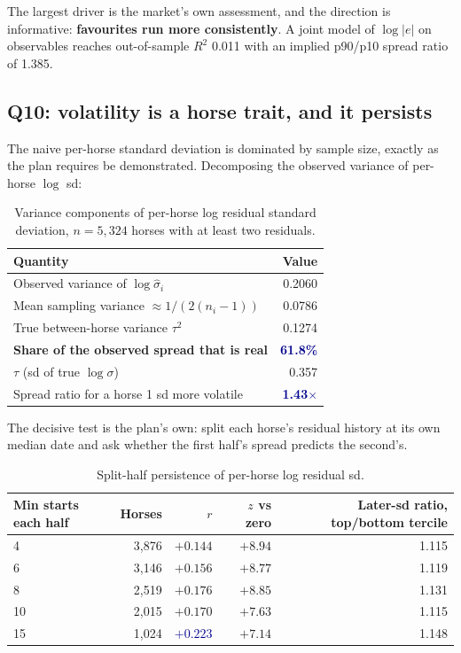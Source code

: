 \documentclass[11pt,a4paper]{article}
\newcommand{\good}[1]{\textcolor{darkblue}{\textbf{#1}}}
\begin{document}
The largest driver is the market's own assessment, and the direction is
informative: \textbf{favourites run more consistently}. A joint model of
$\log|e|$ on observables reaches out-of-sample $R^2$ 0.011 with an implied
p90/p10 spread ratio of 1.385.

\subsection{Q10: volatility is a horse trait, and it persists}

The naive per-horse standard deviation is dominated by sample size, exactly as the
plan requires be demonstrated. Decomposing the observed variance of per-horse
$\log$ sd:

\begin{table}[htbp]\centering\small
\caption{Variance components of per-horse log residual standard deviation,
$n=5{,}324$ horses with at least two residuals.}
\begin{tabular}{lr}
\toprule
Quantity & Value\\
\midrule
Observed variance of $\log \hat{\sigma}_i$ & 0.2060\\
Mean sampling variance $\approx 1/(2(n_i-1))$ & 0.0786\\
True between-horse variance $\tau^2$ & 0.1274\\
\textbf{Share of the observed spread that is real} & \good{61.8\%}\\
$\tau$ (sd of true $\log\sigma$) & 0.357\\
Spread ratio for a horse 1 sd more volatile & \good{1.43$\times$}\\
\bottomrule
\end{tabular}
\end{table}

The decisive test is the plan's own: split each horse's residual history at its
own median date and ask whether the first half's spread predicts the second's.

\begin{table}[htbp]\centering\small
\caption{Split-half persistence of per-horse log residual sd.}
\begin{tabular}{lrrrr}
\toprule
Min starts each half & Horses & $r$ & $z$ vs zero & Later-sd ratio, top/bottom tercile\\
\midrule
4 & 3{,}876 & $+0.144$ & $+8.94$ & 1.115\\
6 & 3{,}146 & $+0.156$ & $+8.77$ & 1.119\\
8 & 2{,}519 & $+0.176$ & $+8.85$ & 1.131\\
10 & 2{,}015 & $+0.170$ & $+7.63$ & 1.115\\
15 & 1{,}024 & \good{$+0.223$} & $+7.14$ & 1.148\\
\bottomrule
\end{tabular}
\end{table}
\end{document}
